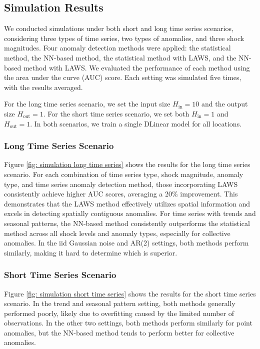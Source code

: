 \documentclass[11pt]{article}
\begin{document}
\subsection{Simulation Results}
We conducted simulations under both short and long time series scenarios, considering three types of time series, two types of anomalies, and three shock magnitudes. Four anomaly detection methods were applied: the statistical method, the NN-based method, the statistical method with LAWS, and the NN-based method with LAWS. We evaluated the performance of each method using the area under the curve (AUC) score. Each setting was simulated five times, with the results averaged.


For the long time series scenario, we set the input size $H_{\mathrm{in}}=10$ and the output size $H_{\mathrm{out}}=1$. For the short time series scenario, we set both $H_{\mathrm{in}}=1$ and $H_{\mathrm{out}}=1$. In both scenarios, we train a single DLinear model for all locations.
\subsubsection*{Long Time Series Scenario}
Figure \ref{fig: simulation long time series} shows the results for the long time series scenario. For each combination of time series type, shock magnitude, anomaly type, and time series anomaly detection method, those incorporating LAWS consistently achieve higher AUC scores, averaging a 20\% improvement. This demonstrates that the LAWS method effectively utilizes spatial information and excels in detecting spatially contiguous anomalies. For time series with trends and seasonal patterns, the NN-based method consistently outperforms the statistical method across all shock levels and anomaly types, especially for collective anomalies. In the iid Gaussian noise and AR(2) settings, both methods perform similarly, making it hard to determine which is superior.

\subsubsection*{Short Time Series Scenario}
Figure \ref{fig: simulation short time series} shows the results for the short time series scenario. In the trend and seasonal pattern setting, both methods generally performed poorly, likely due to overfitting caused by the limited number of observations. In the other two settings, both methods perform similarly for point anomalies, but the NN-based method tends to perform better for collective anomalies. 
\end{document}
